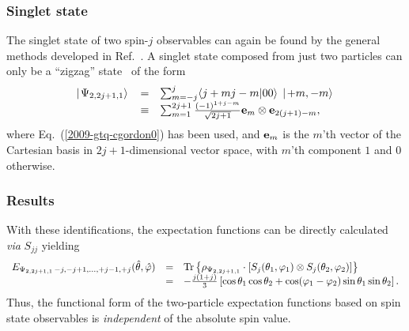 \documentclass[pra,amsfonts,showpacs,showkeys,preprint]{revtex4}
\begin{document}
\subsubsection*{Singlet state}

The singlet state of two spin-$j$ observables
can again be found by the general methods developed in Ref.~\cite{schimpf-svozil}.
A singlet state composed from just two particles can only be a ``zigzag'' state~\cite{schimpf-svozil}
of the form
\begin{equation}
\begin{array}{rcl}
\left|  \left. \Psi_{2,2j+1,1} \right\rangle  \right.
&=&
\sum_{m=-j}^{j}
\langle j+mj-m\vert 00\rangle
\;
\left| \left. +m ,-m \right\rangle \right. \\
&\equiv &
\sum_{m=1}^{2j+1}
\frac{(-1)^{1+j-m}}{\sqrt{2j+1}}
{\bf e}_m \otimes {\bf e}_{2(j+1)-m}
,
\end{array}
\label{e-2009-gtq-zz}
\end{equation}
where Eq.~(\ref{2009-gtq-cgordon0}) has been used,
and ${\bf e}_m$ is the $m$'th vector of the Cartesian basis in $2j+1$-dimensional
vector space, with $m$'th component $1$ and $0$ otherwise.



\subsubsection*{Results}




With these identifications, the expectation functions can be directly calculated {\it via} $S_{jj}$ yielding
\begin{equation}
\begin{array}{rcl}
E_{{ \Psi_{2,2j+1,1}}\,-j,-j+1,\ldots,+j-1, +j } ({\hat \theta},{\hat \varphi} )
&=&
{\rm Tr}\left\{ \rho_{ \Psi_{2,2j+1,1}} \cdot \left[ S_{j}(\theta_1,\varphi_1) \otimes S_{j}(\theta_2,\varphi_2)\right]\right\} \\
&=& -\frac{j(1+j)}{3} \left[\cos \theta_1 \cos \theta_2 + \cos (\varphi_1 - \varphi_2) \sin \theta_1 \sin \theta_2\right]  .
\end{array}
\label{2009-gtq-edosgcjj}
\end{equation}
Thus, the functional form of the two-particle expectation functions based on spin state observables is {\em
independent} of the absolute spin value.




\end{document}

